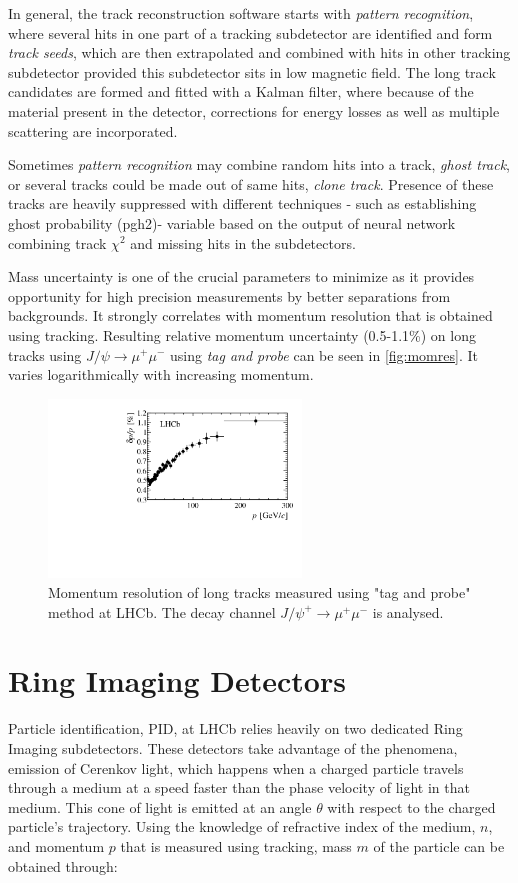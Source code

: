 In general, the track reconstruction software starts with \textit{pattern recognition}, where several hits in one part of a tracking subdetector are identified and form \textit{track seeds}, which are then extrapolated and combined with hits in other tracking subdetector provided this subdetector sits in low magnetic field. The long track candidates are formed and fitted with a Kalman filter\cite{Hierk:684697}, where because of the material present in the detector, corrections for energy losses as well as multiple scattering are incorporated.

Sometimes \textit{pattern recognition} may combine random hits into a track, \textit{ghost track}, or several tracks could be made out of same hits, \textit{clone track}. Presence of these tracks are heavily suppressed with different techniques - such as establishing ghost probability (\Gls{pgh2})- variable based on the output of neural network combining track $\chi^{2}$ and missing hits in the subdetectors.

Mass uncertainty is one of the crucial parameters to minimize as it provides opportunity for high precision measurements by better separations from backgrounds. It strongly correlates with momentum resolution that is obtained using tracking. Resulting relative momentum uncertainty (0.5-1.1\%) on long tracks using $J/\psi \rightarrow \mu^{+} \mu^{-}$ using \textit{tag and probe} can be seen in \autoref{fig:momres}. It varies logarithmically with increasing momentum.


\begin{figure}[!h]
	\centering
	\includegraphics[width = 0.6\textwidth]{figs/detector/momresolution.png}
	\caption{Momentum resolution of long tracks measured using "tag and probe" method at LHCb. The decay channel $J/\psi^{+} \rightarrow \mu^{+} \mu^{-}$ is analysed.}
	\label{fig:momres}
\end{figure}

\section{Ring Imaging Detectors}
Particle identification, \Gls{PID}, at \Gls{LHCb} relies heavily on two dedicated Ring Imaging subdetectors. These detectors take advantage of the phenomena, emission of Cerenkov light, which happens when a charged particle travels through a medium at a speed faster than the phase velocity of light in that medium. This cone of light is emitted at an angle $\theta$ with respect to the charged particle's trajectory. Using the knowledge of refractive index of the medium, $n$, and momentum $p$ that is measured using tracking, mass $m$ of the particle can be obtained through:

